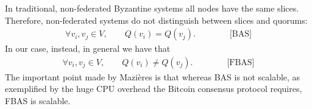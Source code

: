 In traditional, non-federated Byzantine systems all nodes have the same slices. Therefore, non-federated systems do not distinguish between slices and quorums:
\begin{align}
\forall v_i, v_j \in V, \qquad Q(v_i) = Q(v_j). \qquad\qquad \text{[BAS]} 
\end{align}
In our case, instead, in general we have that
\begin{align}
\forall v_i, v_j \in V, \qquad Q(v_i) \ne Q(v_j). \qquad\qquad \text{[FBAS]} 
\end{align}
The important point made by Mazi\`eres is that whereas BAS is not scalable, as exemplified by the huge CPU overhead the Bitcoin consensus protocol requires, FBAS is scalable.

\begin{center}
\small
{}
\end{center}
